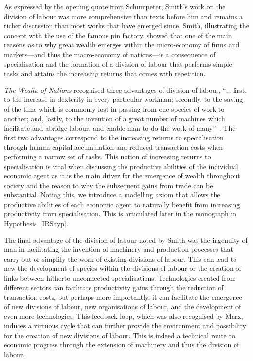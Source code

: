 As expressed by the opening quote from Schumpeter, Smith's work on the division of labour was more comprehensive than texts before him and remains a richer discussion than most works that have emerged since. Smith, illustrating the concept with the use of the famous pin factory, showed that one of the main reasons as to why great wealth emerges within the micro-economy of firms and markets---and thus the macro-economy of nations---is a consequence of specialisation and the formation of a division of labour that performs simple tasks and attains the increasing returns that comes with repetition.

\emph{The Wealth of Nations} recognised three advantages of division of labour, ``... first, to the increase in dexterity in every particular workman; secondly, to the saving of the time which is commonly lost in passing from one species of work to another; and, lastly, to the invention of a great number of machines which facilitate and abridge labour, and enable man to do the work of many''~\citep[p.~7]{Smith1776}. The first two advantages correspond to the increasing returns to specialisation through human capital accumulation and reduced transaction costs when performing a narrow set of tasks. This notion of increasing returns to specialisation is vital when discussing the productive abilities of the individual economic agent as it is the main driver for the emergence of wealth throughout society and the reason to why the subsequent gains from trade can be substantial. Noting this, we introduce a modelling axiom that allows the productive abilities of each economic agent to naturally benefit from increasing productivity from specialisation. This is articulated later in the monograph in Hypothesis~\ref{IRShyp}.

The final advantage of the division of labour noted by Smith was the ingenuity of man in facilitating the invention of machinery and production processes that carry out or simplify the work of existing divisions of labour. This can lead to new the development of species within the divisions of labour or the creation of links between hitherto unconnected specialisations. Technologies created from different sectors can facilitate productivity gains through the reduction of transaction costs, but perhaps more importantly, it can facilitate the emergence of new divisions of labour, new organisations of labour, and the development of even more technologies. This feedback loop, which was also recognised by Marx, induces a virtuous cycle that can further provide the environment and possibility for the creation of new divisions of labour. This is indeed a technical route to economic progress through the extension of machinery and thus the division of labour.

